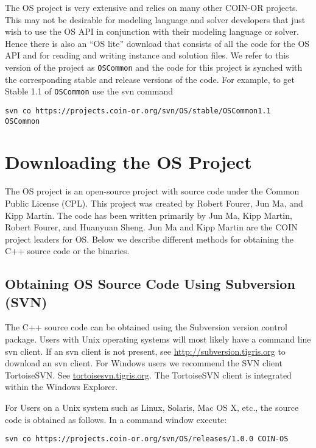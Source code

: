 \documentclass[11pt]{article}
\renewcommand{\_}{{\char"5F}}
\renewcommand{\{}{{\char"7B}}
\renewcommand{\}}{{\char"7D}}
\renewcommand{\^}{{\char"0D}}
\renewcommand{\'}{{\char"0D}}
\begin{document}
The OS project is very extensive and relies on many other COIN-OR projects.  This may not be desirable for modeling language and solver developers that just wish to use the OS API in conjunction with their modeling language or solver.  Hence there is also an ``OS lite'' download that consists of all the code for the OS API and for reading and writing instance and solution files. We refer to this version of the project as {\tt OSCommon} and the code for this project is synched  with the corresponding stable and release versions of the code. For example, to get Stable 1.1 of {\tt OSCommon} use the svn command
\begin{verbatim}
svn co https://projects.coin-or.org/svn/OS/stable/OSCommon1.1  OSCommon
\end{verbatim}


\section{Downloading the OS Project}\label{section:download}

The OS project is an open-source project  with source code under the Common Public License (CPL). This project was created by Robert Fourer, Jun Ma, and Kipp Martin. The code has been written primarily by Jun Ma, Kipp Martin, Robert Fourer, and Huanyuan Sheng.  Jun Ma and Kipp Martin are the COIN project leaders for OS.    Below we describe different methods for obtaining the C++ source code or the binaries.




\subsection{Obtaining OS Source Code Using Subversion (SVN)}\label{section:svn}

The C++ source code can be obtained using the Subversion version control package.  Users with Unix operating systems will most likely have a command line svn client.  If an svn client is not present, see \url{http://subversion.tigris.org} to download an svn client.   For Windows users we recommend the  SVN client  TortoiseSVN.  See \url{tortoisesvn.tigris.org}.  The TortoiseSVN client is integrated within the Windows  Explorer.

For Users on a Unix system such as Linux, Solaris, Mac OS X, etc., the source code is obtained as follows. In a command window execute:

\begin{verbatim}
svn co https://projects.coin-or.org/svn/OS/releases/1.0.0 COIN-OS
\end{verbatim}
\end{document}
